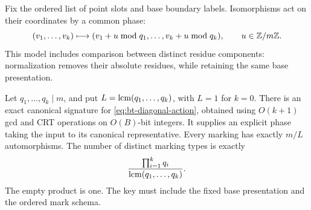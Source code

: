 Fix the ordered list of point slots and base boundary labels.  Isomorphisms
act on their coordinates by a common phase:
\begin{equation}\label{eq:bt-diagonal-action}
 (v_1,\ldots,v_k)\longmapsto
 (v_1+u\bmod q_1,\ldots,v_k+u\bmod q_k),\qquad u\in\mathbb Z/m\mathbb Z.
\end{equation}
This model includes comparison between distinct residue components:
normalization removes their absolute residues, while retaining the same
base presentation.

\begin{theorem}\label{thm:bt-canonical}
Let $q_1,\ldots,q_k\mid m$, and put
$L=\operatorname{lcm}(q_1,\ldots,q_k)$, with $L=1$ for $k=0$.
There is an exact canonical signature for
\eqref{eq:bt-diagonal-action}, obtained using $O(k+1)$ gcd and CRT
operations on $O(B)$-bit integers.  It supplies an explicit phase taking
the input to its canonical representative.  Every marking has exactly
$m/L$ automorphisms.  The number of distinct marking types is exactly
\begin{equation}\label{eq:bt-exact-type-count}
 \frac{\prod_{i=1}^{k}q_i}{\operatorname{lcm}(q_1,\ldots,q_k)}.
\end{equation}
The empty product is one.  The key must include the fixed base
presentation and the ordered mark schema.
\end{theorem}
